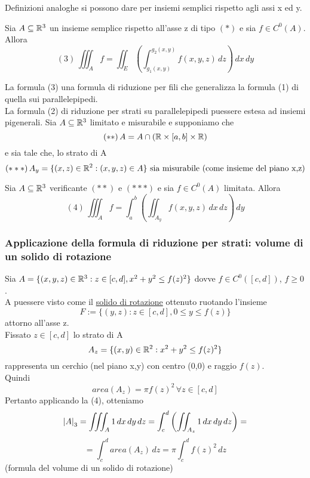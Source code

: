 \begin{osservazione}
  Definizioni analoghe si possono dare per insiemi semplici rispetto agli assi x ed y.
\end{osservazione}
\begin{theorem}
  Sia $A\subseteq \mathbb{R}^3$ un insieme semplice rispetto all'asse z di tipo $(*)$ e sia 
  $f\in C^0(A)$. Allora 
  $$(3)\, \iiint_{A}f = \iint_{E} \left(\int_{g_1(x,y)}^{g_2(x,y)} f(x,y,z) \,dz\right) \,dx\,dy$$
\end{theorem}
\begin{osservazione}
  La formula (3) \ace una formula di riduzione per fili che generalizza la formula (1) di quella sui parallelepipedi.\\
  La formula (2) di riduzione per strati su parallelepipedi pu\aco essere estesa ad insiemi pi\acu generali.
  Sia $A\subseteq \mathbb{R}^3$ limitato e misurabile e supponiamo che 
  $$(**) \, A = A \cap \left(\mathbb{R}\times[a,b]\times\mathbb{R}\right)$$
  e sia tale che, lo strato di A 
  $$(***) \, A_y = \{(x,z)\in\mathbb{R}^2:(x,y,z)\in A\} \text{ sia misurabile (come insieme del piano x,z)}$$
\end{osservazione}
\begin{theorem}
  Sia $A\subseteq \mathbb{R}^3$ verificante $(**)$ e $(***)$ e sia $f \in C^0(A)$ limitata. Allora
  $$(4) \, \iiint_{A}f = \int_{a}^{b} \left(\iint_{A_y} f(x,y,z) \,dx \,dz\right)\,dy$$
\end{theorem}
\subsubsection{Applicazione della formula di riduzione per strati: volume di un solido di rotazione}
Sia $A = \{(x,y,z)\in\mathbb{R}^3: z \in [c,d], x^2+y^2\leq f(z)^2\}$ dovve $f\in C^0([c,d])$, $f\geq 0$.\\
A pu\aco essere visto come il \underline{solido di rotazione} ottenuto ruotando l'insieme
$$F:=\{(y,z):z\in[c,d], 0\leq y \leq f(z)\}$$
attorno all'asse z.\\
Fissato $z \in [c,d]$ lo strato di A
$$A_z = \{(x,y)\in \mathbb{R}^2: x^2+y^2 \leq f(z)^2\}$$
rappresenta un cerchio (nel piano x,y) con centro (0,0) e raggio $f(z)$. \\
Quindi 
$$area(A_z) = \pi f(z)^2 \, \forall z \in [c,d]$$
Pertanto applicando la (4), otteniamo 
$$\left\lvert A \right\rvert_3 = \iiint_A 1 \,dx\,dy\,dz = \int_{c}^{d} \left(\iint_{A_z} 1 \,dx\,dy\,dz\right) = $$
$$= \int_{c}^{d} area(A_z) \,dz = \pi \int_{c}^{d} f(z)^2 \,dz$$
(formula del volume di un solido di rotazione)

